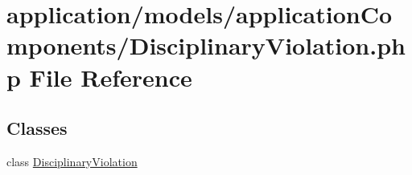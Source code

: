 \hypertarget{_disciplinary_violation_8php}{\section{application/models/application\-Components/\-Disciplinary\-Violation.php File Reference}
\label{_disciplinary_violation_8php}
}
\subsection*{Classes}
\begin{DoxyCompactItemize}
\item 
class \hyperlink{class_disciplinary_violation}{Disciplinary\-Violation}
\end{DoxyCompactItemize}
